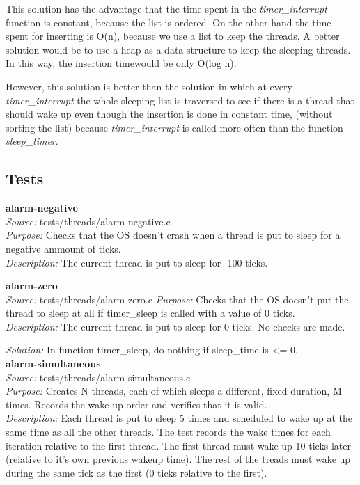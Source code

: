 	This solution has the advantage that the time spent in the \textit{timer\_interrupt} function is constant, because the list is ordered. On the other hand the time spent for inserting is O(n), because we use a list to keep the threads. A better solution would be to use a heap as a data structure to keep the sleeping threads. In this way, the insertion timewould be only O(log n). 

	However, this solution is better than the solution in which at every \textit{timer\_interrupt} the whole sleeping list is traversed to see if there is a thread that should wake up even though the insertion is done in constant time, (without sorting the list) because \textit{timer\_interrupt} is called more often than the function \textit{sleep\_timer}.

    \subsection{Tests}

    \textbf{alarm-negative}\\
    \textit{Source:} tests/threads/alarm-negative.c\\
    \textit{Purpose:} Checks that the OS doesn't crash when a thread is put to sleep for a negative ammount of ticks.\\
    \textit{Description:} The current thread is put to sleep for -100 ticks.
    
    \textbf{alarm-zero}\\
    \textit{Source:} tests/threads/alarm-zero.c
    \textit{Purpose:} Checks that the OS doesn't put the thread to sleep at all if timer\_sleep is called with a value of 0 ticks.\\
    \textit{Description:} The current thread is put to sleep for 0 ticks. No checks are made.
    
    \textit{Solution: } In function timer\_sleep, do nothing if sleep\_time is <= 0.\\

    \textbf{alarm-simultaneous}\\
    \textit{Source:} tests/threads/alarm-simultaneous.c\\
    \textit{Purpose:} Creates N threads, each of which sleeps a different, fixed duration, M times. Records the wake-up order and verifies that it is valid.\\
    \textit{Description:} Each thread is put to sleep 5 times and scheduled to wake up at the same time as all the other threads. The test records the wake times for each iteration relative to the first thread. The first thread must wake up 10 ticks later (relative to it's own previous wakeup time). The rest of the treads must wake up during the same tick as the first (0 ticks relative to the first).

